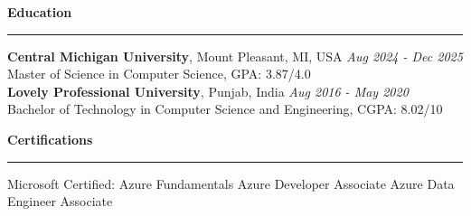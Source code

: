 \documentclass[11pt,letterpaper]{article}
\newcommand{\ressection}[1]{\Needspace{6\baselineskip}\vspace{8pt}\par\textbf{#1}\par\vspace{2pt}\hrule\vspace{5pt}}
\begin{document}
\ressection{Education}
\textbf{Central Michigan University}, Mount Pleasant, MI, USA \hfill \textit{Aug 2024 - Dec 2025}\\
Master of Science in Computer Science, GPA: 3.87/4.0\\
\textbf{Lovely Professional University}, Punjab, India \hfill \textit{Aug 2016 - May 2020}\\
Bachelor of Technology in Computer Science and Engineering, CGPA: 8.02/10

\ressection{Certifications}
Microsoft Certified: Azure Fundamentals \textbar{} Azure Developer Associate \textbar{} Azure Data Engineer Associate
\end{document}
